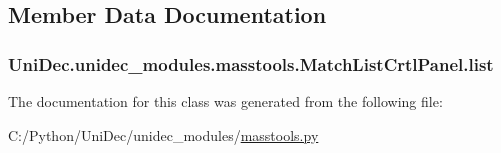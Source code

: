 \subsection{Member Data Documentation}
\hypertarget{class_uni_dec_1_1unidec__modules_1_1masstools_1_1_match_list_crtl_panel_a8b31837ffb5c0ba35c0a0a8b498c3650}{}
\subsubsection[{list}]{\setlength{\rightskip}{0pt plus 5cm}Uni\+Dec.\+unidec\+\_\+modules.\+masstools.\+Match\+List\+Crtl\+Panel.\+list}\label{class_uni_dec_1_1unidec__modules_1_1masstools_1_1_match_list_crtl_panel_a8b31837ffb5c0ba35c0a0a8b498c3650}


The documentation for this class was generated from the following file\+:\begin{DoxyCompactItemize}
\item 
C\+:/\+Python/\+Uni\+Dec/unidec\+\_\+modules/\hyperlink{masstools_8py}{masstools.\+py}\end{DoxyCompactItemize}
